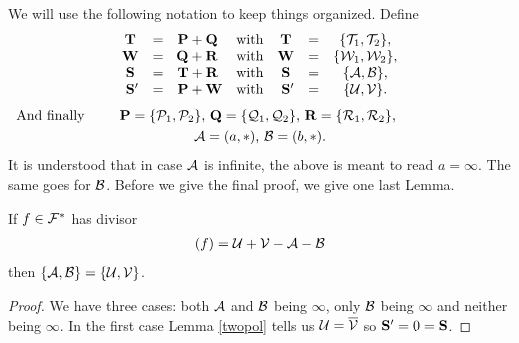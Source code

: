 \documentclass[english,11pt,a4paper]{article}
\begin{document}
We will use the following notation to keep things organized. Define
\begin{align*}
  \begin{array}{cclcccc}
    \T &=& \P + \Q &\text{with}& \T &=& \{\t_1,\t_2\},\\
    \W &=& \text{\hspace{-0.3mm}}\Q + \R &\text{with}& \W &=& \{\w_1,\w_2\},\\
    \phantom{'}\S\phantom{'} &=& \T + \R &\text{with}& \phantom{'}\S\phantom{'} &=& \{\a, \b \},\\
    \phantom{'}\S'&=& \P + \W &\text{with}& \phantom{'}\S'&=& \{\u, \v \}.\\
  \end{array}
\end{align*}\vspace{-7mm}
\begin{gather*}\rlap{\hspace{-26mm}And finally}
  \P = \{\p_1,\p_2\}\text{, }
  \Q = \{\q_1,\q_2\}\text{, }
  \R = \{\r_1,\r_2\}\text{, } \\
  \a = (a,*) \text{, } \b = (b,*).
\end{gather*}
It is understood that in case $\a$ is infinite, the above is meant to read $a = \infty$. The same goes for $\b$. Before we give the final proof, we give one last Lemma.

\begin{lemma}
  If $f \in \F^*$ has divisor
  \begin{align*}
    (f) = \u + \v -\a -\b
  \end{align*}
  then $\{ \a, \b \} = \{\u, \v \}$.
  \begin{proof}
    We have three cases: both $\a$ and $\b$ being $\infty$, only $\b$ being $\infty$ and neither being $\infty$. In the first case Lemma \ref{twopol} tells us $\u = \bar \v$ so $\S' = 0 = \S$.
  \end{proof}
\end{lemma}
\end{document}
